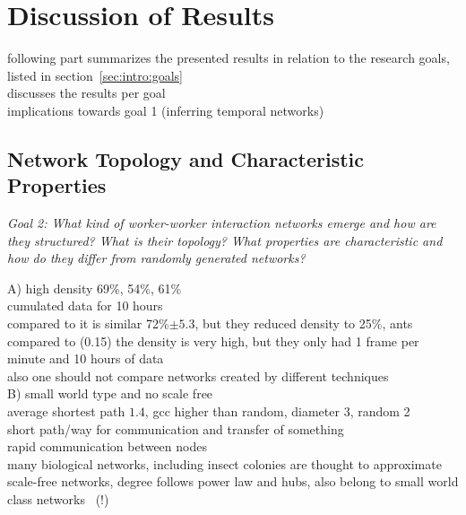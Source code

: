 \section{Discussion of Results}

following part summarizes the presented results in relation to the research goals, listed in section~\ref{sec:intro:goals}\\
discusses the results per goal\\
implications towards goal 1 (inferring temporal networks)\\


\subsection{Network Topology and Characteristic Properties}
\emph{Goal 2:
What kind of worker-worker interaction networks emerge and how are they structured?
What is their topology?
What properties are characteristic and how do they differ from randomly generated networks?}

A) high density 69\%, 54\%, 61\%\\
cumulated data for 10 hours\\
compared to \textcite{mersch2013tracking} it is similar 72\%$\pm5.3$, but they reduced density to 25\%, ants\\
compared to \textcite{baracchi2014socio} (0.15) the density is very high, but they only had 1 frame per minute and 10 hours of data\\
also one should not compare networks created by different techniques~\cite{castles2014social}\\

B) small world type and no scale free\\
average shortest path $1.4$,
gcc higher than random,
diameter 3, random 2\\
short path/way for communication and transfer of something\\
rapid communication between nodes\\
many biological networks, including insect colonies are thought to approximate scale-free networks, degree follows power law and hubs, also belong to small world class networks~\textcite{holme2013temporalbook} (!)\\

